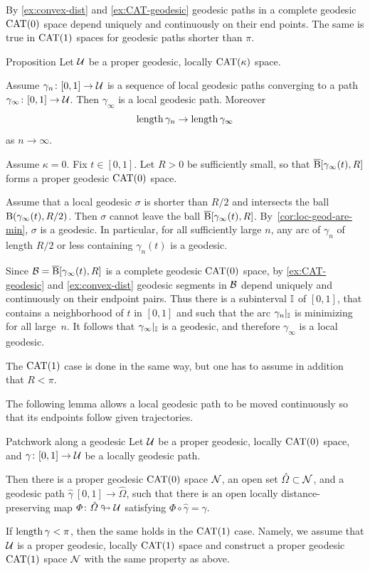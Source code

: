 By \eqref{ex:convex-dist} and \eqref{ex:CAT-geodesic} geodesic paths in a complete geodesic $\mathrm{CAT}(0)$ space depend uniquely and continuously on their end points.
The same is true in $\mathrm{CAT}(1)$ spaces for geodesic paths shorter than $\pi$.

\begin{thm}{Proposition}\label{prop:geo-complete}
Let $\mathcal{U}$ be a proper geodesic, locally $\mathrm{CAT}(\kappa)$ space.

Assume $\gamma_n\colon[0,1]\to\mathcal{U}$ is a sequence of local geodesic paths converging to a path $\gamma_\infty\colon[0,1]\to\mathcal{U}$.
Then $\gamma_\infty$ is a local geodesic path.
Moreover 
\[\mathop{\rm length}\nolimits\gamma_n\to\mathop{\rm length}\nolimits\gamma_\infty\]
as $n\to\infty$.
\end{thm}

Assume $\kappa=0$.
Fix $t\in[0,1]$.  
Let $R>0$ be sufficiently small, so that $\overline{\mathrm{B}}{}[\gamma_\infty(t),R]$ forms a proper geodesic $\mathrm{CAT}(0)$ space.

Assume that  a local geodesic $\sigma$  is shorter than $R/2$ and intersects the ball $\mathrm{B}{}(\gamma_\infty(t),R/2)$.
Then $\sigma$ cannot leave the ball $\overline{\mathrm{B}}{}[\gamma_\infty(t),R]$.
By~\ref{cor:loc-geod-are-min}, $\sigma$ is a geodesic.  
In particular, for all sufficiently large $n$, any arc of $\gamma_n$ of length $R/2$ or less containing $\gamma_n(t)$ is a geodesic.

Since $\mathcal{B}=\overline{\mathrm{B}}{}[\gamma_\infty(t),R]$ is a complete geodesic $\mathrm{CAT}(0)$ space, by \ref{ex:CAT-geodesic} and \ref{ex:convex-dist} geodesic segments in $\mathcal{B}$ depend uniquely and continuously on their endpoint pairs.
Thus there is a subinterval $\mathbb{I}$ of $[0,1]$,
that  contains a neighborhood of $t$ in $[0,1]$
and such that the arc $\gamma_n|_{\mathbb{I}}$ is minimizing for all large~$n$.
It follows that $\gamma_\infty|_{\mathbb{I}}$ is a geodesic,
and therefore $\gamma_\infty$ is a local geodesic.

The $\mathrm{CAT}(1)$ case is done in the same way, but one has to assume in addition that $R<\pi$.
\qeds

The following lemma allows a local geodesic path to be moved continuously so that its endpoints follow given trajectories.

\begin{thm}{Patchwork along a geodesic}
\label{lem:patch}
Let $\mathcal{U}$ be a proper geodesic, locally $\mathrm{CAT}(0)$ space, 
and $\gamma\colon[0,1]\to\mathcal{U}$ be a locally geodesic path.

Then there is a proper geodesic  $\mathrm{CAT}(0)$ space   $\mathcal{N}$,
an open set $\hat\Omega\z\subset \spc{N}$,
and a geodesic path $\hat\gamma\:[0,1]\to\hat\Omega$,
such that there is an open locally distance-preserving map 
$\varPhi\colon\hat{\varOmega}\looparrowright\mathcal{U}$ satisfying
$\Phi\circ\hat\gamma=\gamma$.

If $\mathop{\rm length}\nolimits\gamma<\pi$,
then the same holds in the $\mathrm{CAT}(1)$ case.
Namely, we assume that $\mathcal{U}$ is a proper geodesic, locally $\mathrm{CAT}(1)$ space and construct a proper geodesic $\mathrm{CAT}(1)$ space $\mathcal{N}$ with the same property as above.
\end{thm}

